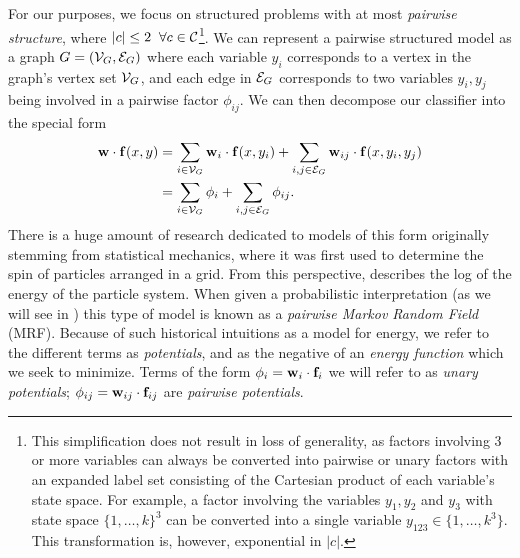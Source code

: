 For our purposes, we focus on structured problems with at most {\em pairwise 
structure}, where $|c| \leq 2\;\; \forall c \in \mathcal{C}$\footnote{This 
simplification does not result in loss of generality, as factors involving 3 or 
more variables can always be converted into pairwise or unary factors with an 
expanded label set consisting of the Cartesian product of each variable's state 
space. For example, a factor involving the variables $y_1,y_2$ and $y_3$ with 
state space $\{1,\ldots,k\}^3$ can be converted into a single variable $y_{123} 
\in \{1,\ldots,k^3\}$.  This transformation is, however, exponential in 
$|c|$.}.  We can represent a pairwise structured model as a graph $G = 
(\mathcal{V}_G,\mathcal{E}_G)$ where each variable $y_i$ corresponds to a vertex in the graph's 
vertex set $\mathcal{V}_G$, and each edge in $\mathcal{E}_G$ corresponds to two variables 
$y_i,y_j$ being involved in a pairwise factor $\phi_{ij}$.  We can then 
decompose our classifier into the special form
\begin{align}
\mathbf{w} \cdot \mathbf{f}(x,y) &= \sum_{i \in \mathcal{V}_G} \mathbf{w}_i \cdot \mathbf{f}(x,y_i) + \sum_{i,j \in 
\mathcal{E}_G} \mathbf{w}_{ij} \cdot \mathbf{f}(x,y_i,y_j) \\
& = \sum_{i \in \mathcal{V}_G} \phi_i + \sum_{i,j \in \mathcal{E}_G} \phi_{ij}.
\label{eq:mrf}
\end{align} There is a huge amount of research dedicated to models of this form 
originally stemming from statistical mechanics, where it was first used to 
determine the spin of particles arranged in a grid. From this perspective, 
 describes the log of the energy of the particle system.  When 
given a probabilistic interpretation (as we will see in )
this type of model is known as a {\em pairwise Markov Random Field} (MRF).  
Because of such historical intuitions as a model for energy, we refer to the 
different terms as {\em potentials}, and  as the negative of an 
{\em energy function} which we seek to minimize.  Terms of the form $\phi_i = 
\mathbf{w}_i \cdot \mathbf{f}_i$ we will refer to as {\em unary potentials}; $\phi_{ij} = 
\mathbf{w}_{ij} \cdot \mathbf{f}_{ij}$ are {\em pairwise potentials}.

